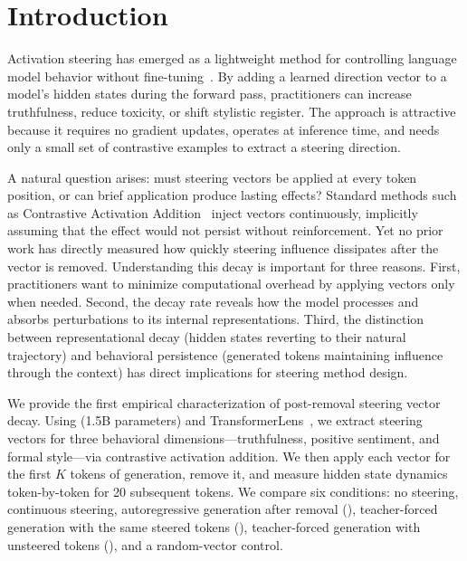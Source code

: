 \section{Introduction}
\label{sec:introduction}

Activation steering has emerged as a lightweight method for controlling language
model behavior without fine-tuning~\citep{turner2023actadd,panickssery2024caa,zou2023repe}.
By adding a learned direction vector to a model's hidden states during the forward
pass, practitioners can increase truthfulness, reduce toxicity, or shift stylistic
register. The approach is attractive because it requires no gradient updates,
operates at inference time, and needs only a small set of contrastive examples
to extract a steering direction.

A natural question arises: must steering vectors be applied at every token
position, or can brief application produce lasting effects? Standard methods
such as Contrastive Activation Addition~\citep{panickssery2024caa} inject
vectors continuously, implicitly assuming that the effect would not persist
without reinforcement. Yet no prior work has directly measured how quickly
steering influence dissipates after the vector is removed. Understanding this
decay is important for three reasons. First, practitioners want to minimize
computational overhead by applying vectors only when needed. Second, the decay
rate reveals how the model processes and absorbs perturbations to its internal
representations. Third, the distinction between representational decay (hidden
states reverting to their natural trajectory) and behavioral persistence
(generated tokens maintaining influence through the context) has direct
implications for steering method design.

We provide the first empirical characterization of post-removal steering vector
decay. Using \gptxl (1.5B parameters) and TransformerLens~\citep{nanda2022transformerlens},
we extract steering vectors for three behavioral dimensions---truthfulness,
positive sentiment, and formal style---via contrastive activation addition.
We then apply each vector for the first $K$ tokens of generation, remove it,
and measure hidden state dynamics token-by-token for 20 subsequent tokens.
We compare six conditions: no steering, continuous steering, autoregressive
generation after removal (\AR), teacher-forced generation with the same steered
tokens (\TF), teacher-forced generation with unsteered tokens (\TFclean), and a
random-vector control.

